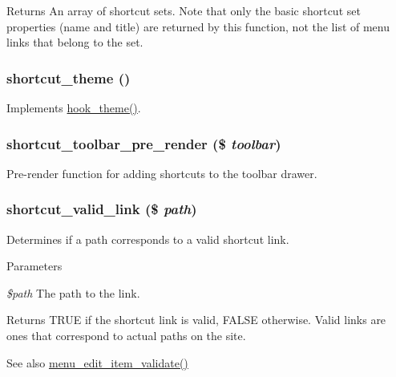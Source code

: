 \begin{DoxyReturn}{Returns}
An array of shortcut sets. Note that only the basic shortcut set properties (name and title) are returned by this function, not the list of menu links that belong to the set. 
\end{DoxyReturn}
\hypertarget{shortcut_8module_a93575ad56150c6b97160144c83cec94e}{
\subsubsection[{shortcut\_\-theme}]{\setlength{\rightskip}{0pt plus 5cm}shortcut\_\-theme ()}}
\label{shortcut_8module_a93575ad56150c6b97160144c83cec94e}
Implements \hyperlink{group__hooks_ga013ccb45c7aaab1c16cf9691428c910d}{hook\_\-theme()}. \hypertarget{shortcut_8module_a0fe1d9ead548329fa4bad82c69ff921e}{
\subsubsection[{shortcut\_\-toolbar\_\-pre\_\-render}]{\setlength{\rightskip}{0pt plus 5cm}shortcut\_\-toolbar\_\-pre\_\-render (\$ {\em toolbar})}}
\label{shortcut_8module_a0fe1d9ead548329fa4bad82c69ff921e}
Pre-\/render function for adding shortcuts to the toolbar drawer. \hypertarget{shortcut_8module_a79b9fad118659485efae61eb194a0466}{
\subsubsection[{shortcut\_\-valid\_\-link}]{\setlength{\rightskip}{0pt plus 5cm}shortcut\_\-valid\_\-link (\$ {\em path})}}
\label{shortcut_8module_a79b9fad118659485efae61eb194a0466}
Determines if a path corresponds to a valid shortcut link.


\begin{DoxyParams}{Parameters}
\item[{\em \$path}]The path to the link. \end{DoxyParams}
\begin{DoxyReturn}{Returns}
TRUE if the shortcut link is valid, FALSE otherwise. Valid links are ones that correspond to actual paths on the site.
\end{DoxyReturn}
\begin{DoxySeeAlso}{See also}
\hyperlink{menu_8admin_8inc_a9b3b72516acaba98b8be3965616cc735}{menu\_\-edit\_\-item\_\-validate()} 
\end{DoxySeeAlso}
